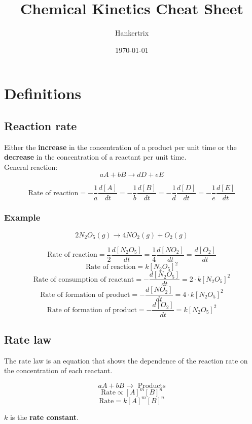 \documentclass[11pt]{article}
\author{Hankertrix}
\date{\today}
\title{Chemical Kinetics Cheat Sheet}
\begin{document}
\maketitle
\setcounter{tocdepth}{2}
\tableofcontents

\newpage

\section{Definitions}
\label{sec:org29eaa41}

\subsection{Reaction rate}
\label{sec:orgd6ee90b}
Either the \textbf{increase} in the concentration of a product per unit time or the \textbf{decrease} in the concentration of a reactant per unit time.
\\[0pt]

General reaction:
\[aA + bB \rightarrow dD + eE\]

\[\text{Rate of reaction} = - \frac{1}{a}\frac{d[A]}{dt} = - \frac{1}{b}\frac{d[B]}{dt} = - \frac{1}{d}\frac{d[D]}{dt} = - \frac{1}{e}\frac{d[E]}{dt}\]

\subsubsection{Example}
\label{sec:orga8845ac}

\[2N_2O_5 (g) \rightarrow 4 NO_2 (g) + O_2 (g)\]

\[\text{Rate of reaction} = \frac{1}{2}\frac{d[N_2O_5]}{dt} = \frac{1}{4}\frac{d[NO_2]}{dt} = \frac{d[O_2]}{dt}\]
\[\text{Rate of reaction} = k[N_2O_5]^2\]
\[\text{Rate of consumption of reactant} = -\frac{d[N_2O_5]}{dt} = 2 \cdot k[N_2O_5]^2\]
\[\text{Rate of formation of product} = -\frac{d[NO_2]}{dt} = 4 \cdot k[N_2O_5]^2\]
\[\text{Rate of formation of product} = -\frac{d[O_2]}{dt} = k[N_2O_5]^2\]

\subsection{Rate law}
\label{sec:orge9546e5}
The rate law is an equation that shows the dependence of the reaction rate on the concentration of each reactant.

\[aA + bB \rightarrow \text{ Products}\]
\[\text{Rate} \propto [A]^m[B]^n\]
\[\text{Rate} = k[A]^m[B]^n\]

\(k\) is the \textbf{rate constant}.
\\[0pt]
\end{document}

